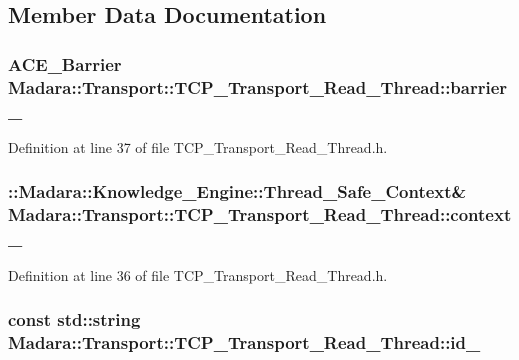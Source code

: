 \subsection{Member Data Documentation}
\hypertarget{classMadara_1_1Transport_1_1TCP__Transport__Read__Thread_a2771ac66938322442de3abbd67338134}{
\subsubsection[{barrier\_\-}]{\setlength{\rightskip}{0pt plus 5cm}ACE\_\-Barrier {\bf Madara::Transport::TCP\_\-Transport\_\-Read\_\-Thread::barrier\_\-}}}
\label{d8/d4c/classMadara_1_1Transport_1_1TCP__Transport__Read__Thread_a2771ac66938322442de3abbd67338134}


Definition at line 37 of file TCP\_\-Transport\_\-Read\_\-Thread.h.

\hypertarget{classMadara_1_1Transport_1_1TCP__Transport__Read__Thread_ab9bb1f237e3fdb0e0a99fb78689c49aa}{
\subsubsection[{context\_\-}]{\setlength{\rightskip}{0pt plus 5cm}::{\bf Madara::Knowledge\_\-Engine::Thread\_\-Safe\_\-Context}\& {\bf Madara::Transport::TCP\_\-Transport\_\-Read\_\-Thread::context\_\-}}}
\label{d8/d4c/classMadara_1_1Transport_1_1TCP__Transport__Read__Thread_ab9bb1f237e3fdb0e0a99fb78689c49aa}


Definition at line 36 of file TCP\_\-Transport\_\-Read\_\-Thread.h.

\hypertarget{classMadara_1_1Transport_1_1TCP__Transport__Read__Thread_ad33ffb6e972d5e04a508430d0ac788d5}{
\subsubsection[{id\_\-}]{\setlength{\rightskip}{0pt plus 5cm}const std::string {\bf Madara::Transport::TCP\_\-Transport\_\-Read\_\-Thread::id\_\-}}}
\label{d8/d4c/classMadara_1_1Transport_1_1TCP__Transport__Read__Thread_ad33ffb6e972d5e04a508430d0ac788d5}


